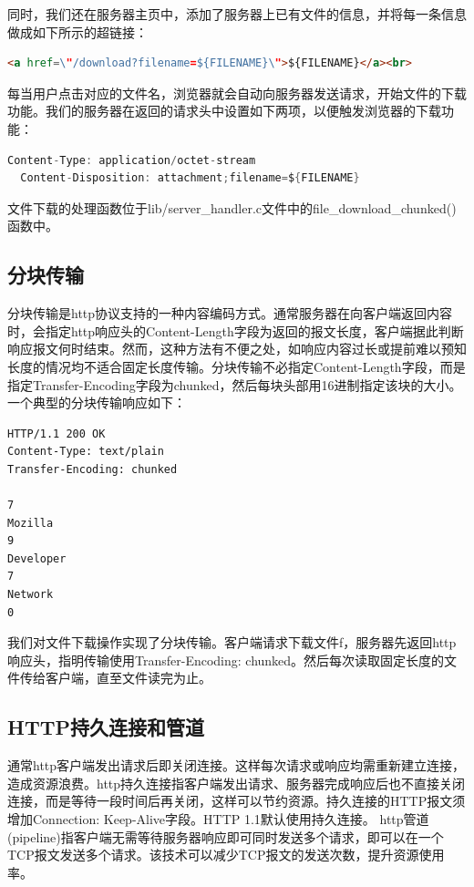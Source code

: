 \documentclass[a4paper]{article}
\begin{document}
同时，我们还在服务器主页中，添加了服务器上已有文件的信息，并将每一条信息做成如下所示的超链接：
\begin{lstlisting}[language=html]
  <a href=\"/download?filename=${FILENAME}\">${FILENAME}</a><br>
\end{lstlisting}

每当用户点击对应的文件名，浏览器就会自动向服务器发送请求，开始文件的下载功能。我们的服务器在返回的请求头中设置如下两项，以便触发浏览器的下载功能：
\begin{lstlisting}[language=C]
  Content-Type: application/octet-stream
  Content-Disposition: attachment;filename=${FILENAME}
\end{lstlisting}

文件下载的处理函数位于lib/server\_handler.c文件中的file\_download\_chunked()函数中。

\subsection{分块传输}
分块传输是http协议支持的一种内容编码方式。通常服务器在向客户端返回内容时，会指定http响应头的Content-Length字段为返回的报文长度，客户端据此判断响应报文何时结束。然而，这种方法有不便之处，如响应内容过长或提前难以预知长度的情况均不适合固定长度传输。分块传输不必指定Content-Length字段，而是指定Transfer-Encoding字段为chunked，然后每块头部用16进制指定该块的大小。一个典型的分块传输响应如下：
\begin{lstlisting}[title = 分块传输HTTP请求头示意]
HTTP/1.1 200 OK
Content-Type: text/plain
Transfer-Encoding: chunked

7
Mozilla
9
Developer
7
Network
0

\end{lstlisting}

我们对文件下载操作实现了分块传输。客户端请求下载文件f，服务器先返回http响应头，指明传输使用Transfer-Encoding: chunked。然后每次读取固定长度的文件传给客户端，直至文件读完为止。


\subsection{HTTP持久连接和管道}
通常http客户端发出请求后即关闭连接。这样每次请求或响应均需重新建立连接，造成资源浪费。http持久连接指客户端发出请求、服务器完成响应后也不直接关闭连接，而是等待一段时间后再关闭，这样可以节约资源。持久连接的HTTP报文须增加Connection: Keep-Alive字段。HTTP 1.1默认使用持久连接。
http管道(pipeline)指客户端无需等待服务器响应即可同时发送多个请求，即可以在一个TCP报文发送多个请求。该技术可以减少TCP报文的发送次数，提升资源使用率。
\end{document}
